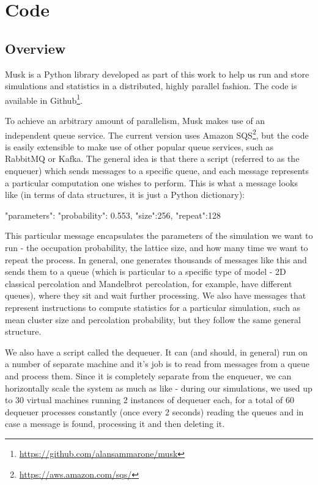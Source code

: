 \chapter{Code}
\label{chap:code}


\section{Overview}
Musk is a Python library developed as part of this work to help us run and store simulations and statistics in a distributed, highly parallel fashion. The code is available in Github\footnote{\url{https://github.com/alansammarone/musk}}.

To achieve an arbitrary amount of parallelism, Musk makes use of an independent queue service. The current version uses Amazon SQS\footnote{\url{https://aws.amazon.com/sqs/}}, but the code is easily extensible to make use of other popular queue services, such as RabbitMQ or Kafka. The general idea is that there a script (referred to as the enqueuer) which sends messages to a specific queue, and each message represents a particular computation one wishes to perform. This is what a message looks like (in terms of data structures, it is just a Python dictionary):

\begin{python}
{
    "parameters": {
        "probability": 0.553, 
        "size":256,
        "repeat":128
    } 
}

\end{python}

This particular message encapsulates the parameters of the simulation we want to run - the occupation probability, the lattice size, and how many time we want to repeat the process. In general, one generates thousands of messages like this and sends them to a queue (which is particular to a specific type of model - 2D classical percolation and Mandelbrot percolation, for example, have different queues), where they sit and wait further processing. We also have messages that represent instructions to compute statistics for a particular simulation, such as mean cluster size and percolation probability, but they follow the same general structure.


We also have a script called the dequeuer. It can (and should, in general) run on a number of separate machine and it's job is to read from messages from a queue and process them. Since it is completely separate from the enqueuer, we can horizontally scale the system as much as like - during our simulations, we used up to 30 virtual machines running 2 instances of dequeuer each, for a total of 60 dequeuer processes constantly (once every 2 seconds) reading the queues and in case a message is found, processing it and then deleting it. 

